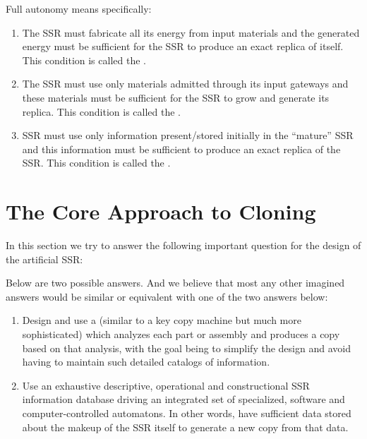 Full autonomy means specifically\citep{freitasmerkle2004}:

\begin{enumerate}
\item The SSR must fabricate all its energy from input materials and the
generated energy must be sufficient for the SSR to produce an exact
replica of itself. This condition is called the . 
\item The SSR must use only materials admitted through its input gateways
and these materials must be sufficient for the SSR to grow and generate
its replica. This condition is called the . 
\item SSR must use only information present/stored initially in the
“mature” SSR and this information must be sufficient to produce an
exact replica of the SSR. This condition is called the
.
\end{enumerate}

\section{The Core Approach to Cloning}

In this section we try to answer the following important question for
the design of the artificial SSR: 

Below are two possible answers. And we believe that most any other
imagined answers would be similar or equivalent with one of the
two answers below:

\begin{enumerate}
\item Design and use a  (similar to a key copy
machine but much more sophisticated) which analyzes each part or assembly and produces
a copy based on that analysis, with the goal being to simplify the design and
avoid having to maintain such detailed catalogs of information.
\item Use an exhaustive descriptive, operational and constructional SSR
information database driving an integrated set of specialized, software
and computer-controlled automatons.  In other words, have sufficient
data stored about the makeup of the SSR itself to generate a new copy
from that data.
\end{enumerate}

